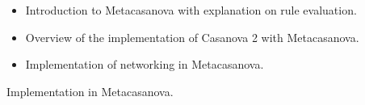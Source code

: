 \begin{itemize}
	\item Introduction to Metacasanova with explanation on rule evaluation.
	\item Overview of the implementation of Casanova 2 with Metacasanova.
	\item Implementation of networking in Metacasanova.
\end{itemize}

Implementation in Metacasanova.
